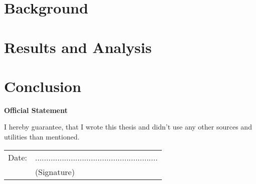 \documentclass[12pt,a4paper,bibliography=totocnumbered,listof=totocnumbered]{scrartcl}
\begin{document}




\pagebreak

\section{Background}

\pagebreak



\section{Results and Analysis}


\section{Conclusion}


\nocite{*}

\renewcommand\refname{Bibliography}



\pagebreak




\newpage
\thispagestyle{empty}
\begin{center}
	\vspace*{5em}
	\huge\textbf{Official Statement}\\
\end{center}
\vspace{2em}

I hereby guarantee, that I wrote this thesis and didn't use any other sources and utilities than mentioned.

\vspace{4em}
\begin{minipage}{\linewidth}
	\begin{tabular}{p{15em}p{15em}}
		Date: &  .......................................................\\
		& \centering (Signature)\\
	\end{tabular}
\end{minipage}
\end{document}
